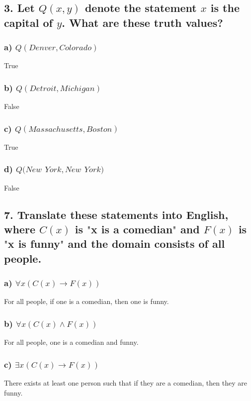 \documentclass[11pt, oneside]{article} %
\numberwithin{equation}{section} %
\numberwithin{figure}{section} %
\numberwithin{table}{section} %
\begin{document}
\section{}
\subsection{3. Let $Q(x, y)$ denote the statement $x$ is the capital of $y$. What are these truth values?}
\subsubsection{a) $Q(Denver, Colorado)$}
True
\subsubsection{b) $Q(Detroit, Michigan)$}
False
\subsubsection{c) $Q(Massachusetts, Boston)$}
True
\subsubsection{d) $Q(New$ $York, New$ $York)$}
False

\subsection{7. Translate these statements into English, where $C(x)$ is $\texttt{"}$x is a comedian$\texttt{"}$ and $F(x)$ is $\texttt{"}$x is funny$\texttt{"}$ and the domain consists of all people.}
\subsubsection{a) $\forall$$x(C(x) \rightarrow F(x))$}
For all people, if one is a comedian, then one is funny.
\subsubsection{b) $\forall$$x(C(x) \wedge F(x))$}
For all people, one is a comedian and funny.
\subsubsection{c) $\exists$$x(C(x) \rightarrow F(x))$}
There exists at least one person such that if they are a comedian, then they are funny.
\end{document}
